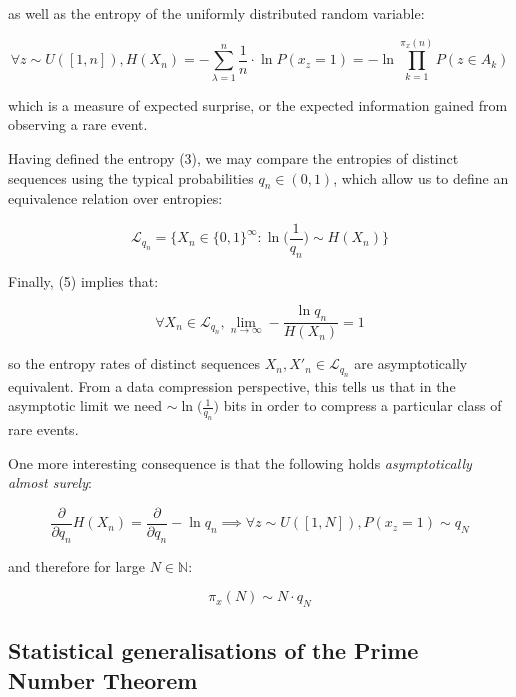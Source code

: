 \documentclass{article}
\begin{document}
as well as the entropy of the uniformly distributed random variable:

\begin{equation}
\forall z \sim U([1,n]), H(X_n) = -\sum_{\lambda =1}^n \frac{1}{n} \cdot \ln P(x_z =1) = -\ln \prod_{k=1}^{\pi_x(n)} P(z \in A_k)
\end{equation}

which is a measure of expected surprise, or the expected information gained from observing a rare event.

Having defined the entropy (3), we may compare the entropies of distinct sequences using the typical probabilities
$q_n \in (0,1)$, which allow us to define an equivalence relation over entropies:

\begin{equation}
\mathcal{L}_{q_n} = \{X_n \in \{0,1\}^{\infty}: \ln \big(\frac{1}{q_n}\big) \sim H(X_n) \}
\end{equation}

\newpage 

Finally, (5) implies that:

\begin{equation}
\forall X_n \in \mathcal{L}_{q_n}, \lim_{n \to \infty} -\frac{\ln q_n}{H(X_n)} = 1
\end{equation}

so the entropy rates of distinct sequences $X_n,X'_n \in \mathcal{L}_{q_n}$ are
asymptotically equivalent. From a data compression perspective, this tells us 
that in the asymptotic limit we need $\sim \ln \big(\frac{1}{q_n}\big)$ bits in order to compress a particular class of rare events. 

One more interesting consequence is that the following holds \textit{asymptotically almost surely}: 

\begin{equation}
\frac{\partial}{\partial q_n} H(X_n) = \frac{\partial}{\partial q_n} -\ln q_n \implies \forall z \sim U([1,N]), P(x_z = 1) \sim q_N
\end{equation} 

and therefore for large $N \in \mathbb{N}$:

\begin{equation}
\pi_x(N) \sim N \cdot q_N 	
\end{equation} 

\subsection{Statistical generalisations of the Prime Number Theorem}
\end{document}
